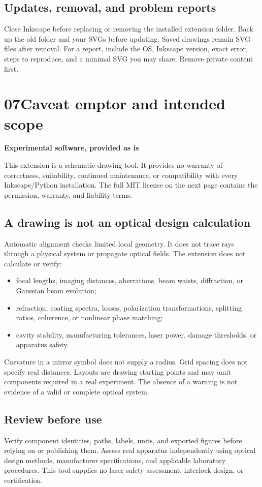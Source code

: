 \documentclass[11pt,a4paper]{article}
\newcommand{\guidepage}[2]{\clearpage\pdfbookmark[0]{#1 - #2}{guide-#1}\section*{\textcolor{accent}{#1}\quad #2}}
\newcommand{\note}[2]{\par\smallskip\noindent\colorbox{pale}{\parbox{\dimexpr\linewidth-18pt\relax}{\vspace{5pt}\textbf{#1}\par\vspace{3pt}#2\vspace{5pt}}}\par\smallskip}
\begin{document}
\subsection*{Updates, removal, and problem reports}
Close Inkscape before replacing or removing the installed extension folder. Back up the old folder and your SVGs before updating. Saved drawings remain SVG files after removal. For a report, include the OS, Inkscape version, exact error, steps to reproduce, and a minimal SVG you may share. Remove private content first.

\guidepage{07}{Caveat emptor and intended scope}
\note{Experimental software, provided as is}{This extension is a schematic drawing tool. It provides no warranty of correctness, suitability, continued maintenance, or compatibility with every Inkscape/Python installation. The full MIT license on the next page contains the permission, warranty, and liability terms.}

\subsection*{A drawing is not an optical design calculation}
Automatic alignment checks limited local geometry. It does not trace rays through a physical system or propagate optical fields. The extension does not calculate or verify:
\begin{itemize}
\item focal lengths, imaging distances, aberrations, beam waists, diffraction, or Gaussian beam evolution;
\item refraction, coating spectra, losses, polarization transformations, splitting ratios, coherence, or nonlinear phase matching;
\item cavity stability, manufacturing tolerances, laser power, damage thresholds, or apparatus safety.
\end{itemize}
Curvature in a mirror symbol does not supply a radius. Grid spacing does not specify real distances. Layouts are drawing starting points and may omit components required in a real experiment. The absence of a warning is not evidence of a valid or complete optical system.

\subsection*{Review before use}
Verify component identities, paths, labels, units, and exported figures before relying on or publishing them. Assess real apparatus independently using optical design methods, manufacturer specifications, and applicable laboratory procedures. This tool supplies no laser-safety assessment, interlock design, or certification.
\end{document}
